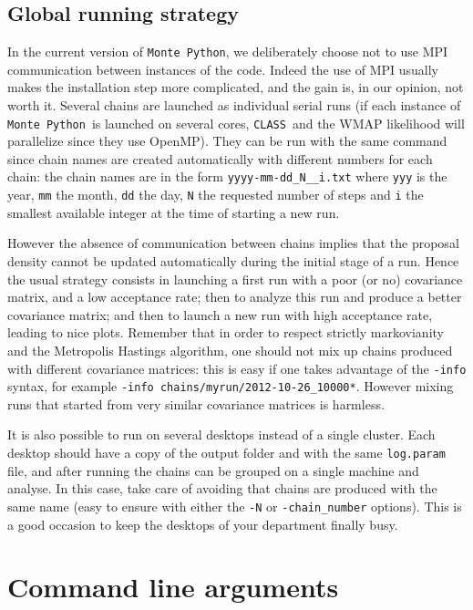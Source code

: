 \documentclass[10pt]{article}
\newcommand{\CLASS}{\texttt{CLASS}}
\newcommand{\MP}{\texttt{Monte Python}}
\begin{document}
\subsection{Global running strategy}
     
In the current version of \MP, we deliberately  choose not to use MPI communication between instances of the code. Indeed the use of MPI usually makes the installation step more complicated, and the gain is, in our opinion, not worth it. Several chains are launched as individual serial runs (if each instance of \MP~is launched on several cores, \CLASS~and the WMAP likelihood will parallelize since they use OpenMP). They can be run with the same command since chain names  are created automatically with different numbers for each chain: the chain names are in  the form
\verb?yyyy-mm-dd_N__i.txt? where {\tt yyy} is the year, {\tt mm} the month, {\tt dd} the day, {\tt N} the requested number of steps and {\tt i} the smallest available integer at the time of starting a new run.

However the absence of communication between chains implies that the proposal density cannot be updated automatically during the initial stage of a run. Hence the usual strategy consists in launching a first run with a poor (or no) covariance matrix, and a low acceptance rate; then to analyze this run and produce a better covariance matrix; and then to launch a new run with high acceptance rate, leading to nice plots. Remember that in order to respect strictly markovianity and the Metropolis Hastings algorithm, one should not mix up chains produced with different covariance matrices: this is easy if one takes advantage of the \verb?-info? syntax, for example \verb?-info chains/myrun/2012-10-26_10000*?. However mixing runs that started from very similar covariance matrices is harmless.

It is also possible to run on several desktops instead of a single cluster. Each desktop should have a copy of the output folder and with the same \verb?log.param? file, and after running the chains can be grouped on a single machine and analyse. In this case, take care of avoiding that chains are produced with the same name (easy to ensure with either the \verb?-N? or \verb?-chain_number? options). This is a good occasion to keep the desktops of your department finally busy.
     
\section{Command line arguments\label{commands}}
\end{document}
